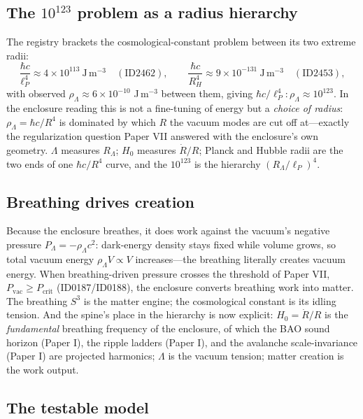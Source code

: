 \documentclass[11pt]{article}
\theoremstyle{remark}
\begin{document}
\subsection{\texorpdfstring{The $10^{123}$ problem as a radius hierarchy}{The 10 to 123 problem as a radius hierarchy}}

The registry brackets the cosmological-constant problem between its two extreme radii:
\begin{equation}
\frac{\hbar c}{\ell_P^4} \approx 4 \times 10^{113}\ \mathrm{J\,m^{-3}} \quad (\text{ID2462}), \qquad
\frac{\hbar c}{R_H^4} \approx 9 \times 10^{-131}\ \mathrm{J\,m^{-3}} \quad (\text{ID2453}),
\end{equation}
with observed $\rho_\Lambda \approx 6 \times 10^{-10}$ J\,m$^{-3}$ between them, giving $\hbar c/\ell_P^4 : \rho_\Lambda \approx 10^{123}$. In the enclosure reading this is not a fine-tuning of energy but a \emph{choice of radius}: $\rho_\Lambda = \hbar c/R^4$ is dominated by which $R$ the vacuum modes are cut off at---exactly the regularization question Paper VII answered with the enclosure's own geometry. $\Lambda$ measures $R_\Lambda$; $H_0$ measures $\dot{R}/R$; Planck and Hubble radii are the two ends of one $\hbar c/R^4$ curve, and the $10^{123}$ is the hierarchy $(R_\Lambda/\ell_P)^4$.

\subsection{Breathing drives creation}

Because the enclosure breathes, it does work against the vacuum's negative pressure $P_\Lambda = -\rho_\Lambda c^2$: dark-energy density stays fixed while volume grows, so total vacuum energy $\rho_\Lambda V \propto V$ increases---the breathing literally creates vacuum energy. When breathing-driven pressure crosses the threshold of Paper VII, $P_{\mathrm{vac}} \geq P_{\mathrm{crit}}$ (ID0187/ID0188), the enclosure converts breathing work into matter. The breathing $S^3$ is the matter engine; the cosmological constant is its idling tension. And the spine's place in the hierarchy is now explicit: $H_0 = \dot{R}/R$ is the \emph{fundamental} breathing frequency of the enclosure, of which the BAO sound horizon (Paper I), the ripple ladders (Paper I), and the avalanche scale-invariance (Paper I) are projected harmonics; $\Lambda$ is the vacuum tension; matter creation is the work output.

\subsection{The testable model}
\end{document}
